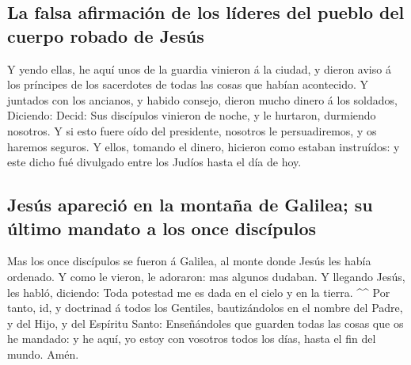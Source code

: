 \hypertarget{la-falsa-afirmaciuxf3n-de-los-luxedderes-del-pueblo-del-cuerpo-robado-de-jesuxfas}{%
\subsection{La falsa afirmación de los líderes del pueblo del cuerpo
robado de
Jesús}\label{la-falsa-afirmaciuxf3n-de-los-luxedderes-del-pueblo-del-cuerpo-robado-de-jesuxfas}}

 Y yendo ellas, he aquí unos de la guardia vinieron á la
ciudad, y dieron aviso á los príncipes de los sacerdotes de todas las
cosas que habían acontecido.  Y juntados con los
ancianos, y habido consejo, dieron mucho dinero á los soldados,
 Diciendo: Decid: Sus discípulos vinieron de noche, y le
hurtaron, durmiendo nosotros.  Y si esto fuere oído del
presidente, nosotros le persuadiremos, y os haremos seguros.
 Y ellos, tomando el dinero, hicieron como estaban
instruídos: y este dicho fué divulgado entre los Judíos hasta el día de
hoy.

\hypertarget{jesuxfas-apareciuxf3-en-la-montauxf1a-de-galilea-su-uxfaltimo-mandato-a-los-once-discuxedpulos}{%
\subsection{Jesús apareció en la montaña de Galilea; su último mandato a
los once
discípulos}\label{jesuxfas-apareciuxf3-en-la-montauxf1a-de-galilea-su-uxfaltimo-mandato-a-los-once-discuxedpulos}}

 Mas los once discípulos se fueron á Galilea, al monte
donde Jesús les había ordenado.  Y como le vieron, le
adoraron: mas algunos dudaban.  Y llegando Jesús, les
habló, diciendo: Toda potestad me es dada en el cielo y en la tierra.
\^{}\^{}  Por tanto, id, y doctrinad á todos los
Gentiles, bautizándolos en el nombre del Padre, y del Hijo, y del
Espíritu Santo:  Enseñándoles que guarden todas las cosas
que os he mandado: y he aquí, yo estoy con vosotros todos los días,
hasta el fin del mundo. Amén.
